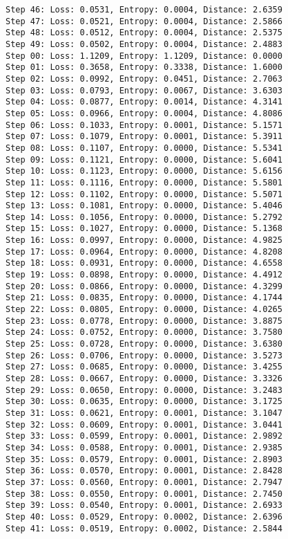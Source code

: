 \documentclass[11pt]{article}
\begin{document}
\begin{Verbatim}[commandchars=\\\{\}]
Step 46: Loss: 0.0531, Entropy: 0.0004, Distance: 2.6359
Step 47: Loss: 0.0521, Entropy: 0.0004, Distance: 2.5866
Step 48: Loss: 0.0512, Entropy: 0.0004, Distance: 2.5375
Step 49: Loss: 0.0502, Entropy: 0.0004, Distance: 2.4883
Step 00: Loss: 1.1209, Entropy: 1.1209, Distance: 0.0000
Step 01: Loss: 0.3658, Entropy: 0.3338, Distance: 1.6000
Step 02: Loss: 0.0992, Entropy: 0.0451, Distance: 2.7063
Step 03: Loss: 0.0793, Entropy: 0.0067, Distance: 3.6303
Step 04: Loss: 0.0877, Entropy: 0.0014, Distance: 4.3141
Step 05: Loss: 0.0966, Entropy: 0.0004, Distance: 4.8086
Step 06: Loss: 0.1033, Entropy: 0.0001, Distance: 5.1571
Step 07: Loss: 0.1079, Entropy: 0.0001, Distance: 5.3911
Step 08: Loss: 0.1107, Entropy: 0.0000, Distance: 5.5341
Step 09: Loss: 0.1121, Entropy: 0.0000, Distance: 5.6041
Step 10: Loss: 0.1123, Entropy: 0.0000, Distance: 5.6156
Step 11: Loss: 0.1116, Entropy: 0.0000, Distance: 5.5801
Step 12: Loss: 0.1102, Entropy: 0.0000, Distance: 5.5071
Step 13: Loss: 0.1081, Entropy: 0.0000, Distance: 5.4046
Step 14: Loss: 0.1056, Entropy: 0.0000, Distance: 5.2792
Step 15: Loss: 0.1027, Entropy: 0.0000, Distance: 5.1368
Step 16: Loss: 0.0997, Entropy: 0.0000, Distance: 4.9825
Step 17: Loss: 0.0964, Entropy: 0.0000, Distance: 4.8208
Step 18: Loss: 0.0931, Entropy: 0.0000, Distance: 4.6558
Step 19: Loss: 0.0898, Entropy: 0.0000, Distance: 4.4912
Step 20: Loss: 0.0866, Entropy: 0.0000, Distance: 4.3299
Step 21: Loss: 0.0835, Entropy: 0.0000, Distance: 4.1744
Step 22: Loss: 0.0805, Entropy: 0.0000, Distance: 4.0265
Step 23: Loss: 0.0778, Entropy: 0.0000, Distance: 3.8875
Step 24: Loss: 0.0752, Entropy: 0.0000, Distance: 3.7580
Step 25: Loss: 0.0728, Entropy: 0.0000, Distance: 3.6380
Step 26: Loss: 0.0706, Entropy: 0.0000, Distance: 3.5273
Step 27: Loss: 0.0685, Entropy: 0.0000, Distance: 3.4255
Step 28: Loss: 0.0667, Entropy: 0.0000, Distance: 3.3326
Step 29: Loss: 0.0650, Entropy: 0.0000, Distance: 3.2483
Step 30: Loss: 0.0635, Entropy: 0.0000, Distance: 3.1725
Step 31: Loss: 0.0621, Entropy: 0.0001, Distance: 3.1047
Step 32: Loss: 0.0609, Entropy: 0.0001, Distance: 3.0441
Step 33: Loss: 0.0599, Entropy: 0.0001, Distance: 2.9892
Step 34: Loss: 0.0588, Entropy: 0.0001, Distance: 2.9385
Step 35: Loss: 0.0579, Entropy: 0.0001, Distance: 2.8903
Step 36: Loss: 0.0570, Entropy: 0.0001, Distance: 2.8428
Step 37: Loss: 0.0560, Entropy: 0.0001, Distance: 2.7947
Step 38: Loss: 0.0550, Entropy: 0.0001, Distance: 2.7450
Step 39: Loss: 0.0540, Entropy: 0.0001, Distance: 2.6933
Step 40: Loss: 0.0529, Entropy: 0.0002, Distance: 2.6396
Step 41: Loss: 0.0519, Entropy: 0.0002, Distance: 2.5844

\end{Verbatim}
\end{document}
